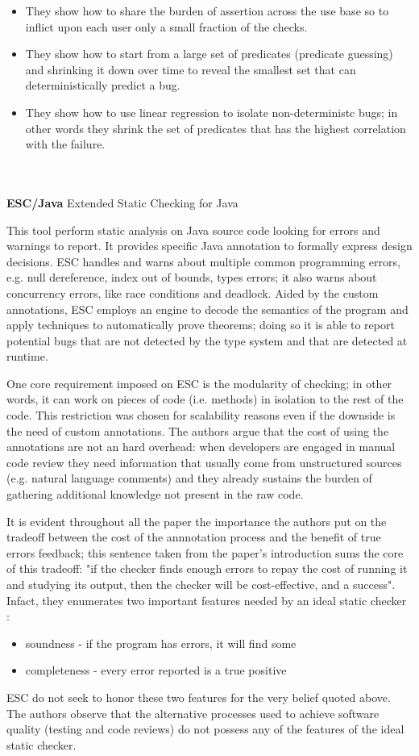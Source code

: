 \begin{itemize}
    \item They show how to share the burden of assertion across the use base so to inflict upon each user only a small fraction of the checks.
    \item They show how to start from a large set of predicates (predicate guessing) and shrinking it down over time to reveal the smallest set that can deterministically predict a bug.
    \item They show how to use linear regression to isolate non-deterministc bugs; in other words they shrink the set of predicates that has the highest correlation with the failure.
\end{itemize}
\\
\\
\textbf{ESC/Java} \cite{flanagan2002extended} Extended Static Checking for Java

This tool perform static analysis on Java source code looking for errors and warnings to report. It provides specific Java annotation to formally express design decisions. 
ESC handles and warns about multiple common programming errors, e.g. null dereference, index out of bounds, types errors; it also warns about concurrency errors, like race conditions and deadlock.
Aided by the custom annotations, ESC employs an engine to decode the semantics of the program and apply techniques to automatically prove theorems; doing so it is able to report potential bugs that are not detected by the type system and that are detected at runtime.


One core requirement imposed on ESC is the modularity of checking; in other words, it can work on pieces of code (i.e. methods) in isolation to the rest of the code. This restriction was chosen for scalability reasons even if the downside is the need of custom annotations.
The authors argue that the cost of using the annotations are not an hard overhead: when developers are engaged in manual code review they need information that usually come from unstructured sources (e.g. natural language comments) and they already sustains the burden of gathering additional knowledge not present in the raw code.

It is evident throughout all the paper the importance the authors put on the tradeoff between the cost of the annnotation process and the benefit of true errors feedback; this sentence taken from the paper's introduction sums the core of this tradeoff: "if the checker finds enough errors to repay the cost of running it and studying its output, then the checker will be cost-effective, and a success".
Infact, they enumerates two important features needed by an ideal static checker : 
\begin{itemize}
    \item soundness - if the program has errors, it will find some
    \item completeness - every error reported is a true positive
\end{itemize}
ESC do not seek to honor these two features for the very belief quoted above. The authors observe that the alternative processes used to achieve software quality (testing and code reviews) do not possess any of the features of the ideal static checker.

